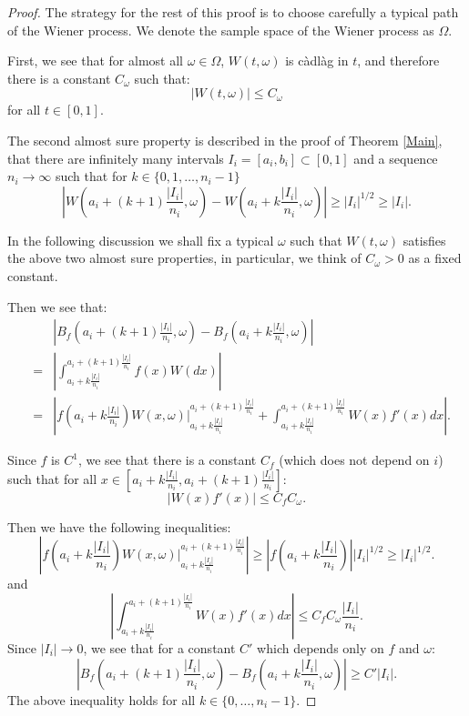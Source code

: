 \begin{proof}
	The strategy for the rest of this proof is to choose carefully a typical path of the Wiener process. We denote the sample space of the Wiener process as $\Omega$.
	
	First, we see that for almost all $\omega\in\Omega$, $W(t,\omega)$ is c\`adl\`ag in $t$, and therefore there is a constant $C_\omega$ such that:
	\[
	|W(t,\omega)|\leq C_\omega
	\]
	for all $t\in [0,1]$. 
	
	The second almost sure property is described in the proof of Theorem \ref{Main}, that there are infinitely many intervals $I_i=[a_i,b_i]\subset [0,1]$ and a sequence $n_i\to\infty$ such that for $k\in\{0,1,\dots,n_i-1\}$
	\[
	\left|W\left(a_i+(k+1)\frac{|I_i|}{n_i},\omega\right)-W\left(a_i+k\frac{|I_i|}{n_i},\omega\right)\right|\geq |I_i|^{1/2}\geq |I_i|.
	\]
	
	In the following discussion we shall fix a typical $\omega$ such that $W(t,\omega)$ satisfies the above two almost sure properties, in particular, we think of $C_\omega>0$ as a fixed constant.
	
	Then we see that:
	\begin{eqnarray*}
		& &\left|B_f\left(a_i+(k+1)\frac{|I_i|}{n_i},\omega\right)-B_f\left(a_i+k\frac{|I_i|}{n_i},\omega\right)\right|\\
		&=& \left| \int_{a_i+k\frac{|I_i|}{n_i}}^{a_i+(k+1)\frac{|I_i|}{n_i}} f(x)W(dx)\right|\\
		&=& \left| f\left(a_i+k\frac{|I_i|}{n_i}\right)W(x,\omega)\bigg\vert_{a_i+k\frac{|I_i|}{n_i}}^{a_i+(k+1)\frac{|I_i|}{n_i}} + \int_{a_i+k\frac{|I_i|}{n_i}}^{a_i+(k+1)\frac{|I_i|}{n_i}} W(x)f'(x)dx \right|.
	\end{eqnarray*}
	
	Since $f$ is $C^1$, we see that there is a constant $C_f$ (which does not depend on $i$) such that for all $x\in \left[{a_i+k\frac{|I_i|}{n_i}},{a_i+(k+1)\frac{|I_i|}{n_i}}\right]$:
	\[
	\left\vert W(x)f'(x)\right\vert \leq C_f C_\omega.
	\]
	
	Then we have the following inequalities:
	\[
	\left| f\left(a_i+k\frac{|I_i|}{n_i}\right)W(x,\omega)\bigg\vert_{a_i+k\frac{|I_i|}{n_i}}^{a_i+(k+1)\frac{|I_i|}{n_i}} \right| \geq \left| f\left(a_i+k\frac{|I_i|}{n_i}\right) \right| |I_i|^{1/2}\geq |I_i|^{1/2}.\tag{**}
	\]
	and
	\[
	\left\vert\int_{a_i+k\frac{|I_i|}{n_i}}^{a_i+(k+1)\frac{|I_i|}{n_i}} W(x)f'(x)dx \right\vert\leq C_fC_\omega\frac{|I_i|}{n_i}.
	\]
	Since $|I_i|\to 0$,  we see that for a constant $C'$ which depends only on $f$ and $\omega$:
	\[
	\left|B_f\left(a_i+(k+1)\frac{|I_i|}{n_i},\omega\right)-B_f\left(a_i+k\frac{|I_i|}{n_i},\omega\right)\right|\geq C'|I_i|.\tag{***}
	\]
	The above inequality holds for all $k\in\{0,\dots,n_i-1\}$. 
	

\end{proof}
